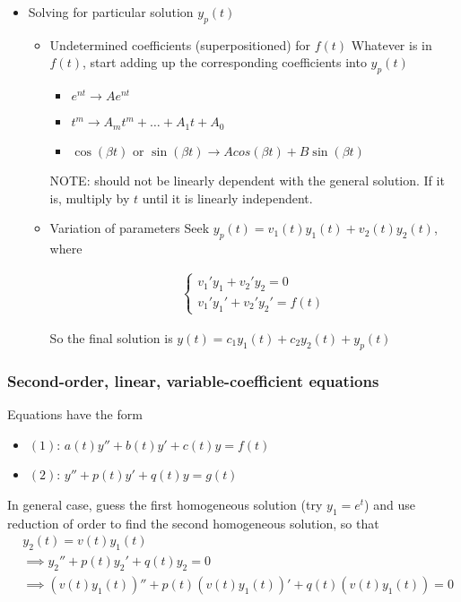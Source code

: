 \documentclass[12pt]{article}
\begin{document}
\begin{itemize}
\item Solving for particular solution \(y_p(t)\)
\label{sec:orge98f139}
\begin{itemize}
\item Undetermined coefficients (superpositioned) for \(f(t)\)
\label{sec:org6d262b2}
Whatever is in \(f(t)\), start adding up the corresponding coefficients into
\(y_p(t)\)

\begin{itemize}
\item \(e^{nt} \to Ae^{nt}\)

\item \(t^m \to A_m t^m + \ldots + A_1 t + A_0\)

\item \(\cos(\beta t)\) or \(\sin(\beta t) \to Acos(\beta t) + B\sin(\beta t)\)
\end{itemize}

NOTE: should not be linearly dependent with the general solution. If it
is, multiply by \(t\) until it is linearly independent.

\item Variation of parameters
\label{sec:org1a42dee}
Seek \(y_p(t) = v_1(t)y_1(t)+v_2(t)y_2(t)\), where

\begin{align*}
	\begin{cases}v_1'y_1+v_2'y_2=0\\v_1'y_1'+v_2'y_2'=f(t)\end{cases}
\end{align*}

So the final solution is \(y(t)=c_1 y_1(t) + c_2 y_2(t) + y_p(t)\)
\end{itemize}
\end{itemize}

\subsubsection*{Second-order, linear, variable-coefficient equations}
\label{sec:org51373a6}
Equations have the form 

\begin{itemize}
\item \((1)\): \(a(t)y'' + b(t)y'+c(t)y = f(t)\)
\item \((2)\): \(y'' + p(t)y'+q(t)y = g(t)\)
\end{itemize}

In general case, guess the first homogeneous solution (try \(y_1=e^t\)) and
use reduction of order to find the second homogeneous solution, so that
\begin{align*}
	 & y_2(t)                                                      = v(t)y_1(t) \\
	 & \implies y_2'' + p(t)y_2' + q(t)y_2                         = 0          \\
	 & \implies (v(t)y_1(t))''+p(t)(v(t)y_1(t))'+q(t)(v(t)y_1(t))  = 0          \\
\end{align*}
\end{document}
